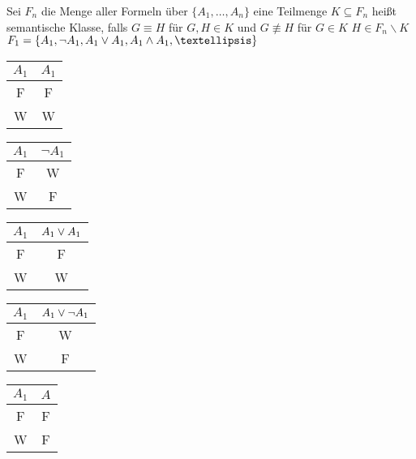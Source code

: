 

Sei $F_n$ die Menge aller Formeln über $\{A_1, …, A_n\}$ eine Teilmenge $K \subseteq F_n$ heißt semantische Klasse, falls $G \equiv H$ für $G, H \in K$ und $G \not\equiv H$ für $G\in K$ \hspace{.5cm} $H \in F_n \backslash K$\\

\beispiel{}
$F_1 = \{A_1, \neg A_1, A_1 \OR A_1, A_1 \AND A_1, … \}$\\

\begin{minipage}{0.15\textwidth}
\begin{tabular}{c|c}
$A_1$ & $A_1$\\
\hline
F & F\\
W & W\\
\end{tabular}
\end{minipage}
\hfill
\begin{minipage}{0.15\textwidth}
\begin{tabular}{c|c}
$A_1$ & $\neg A_1$ \\
\hline
F & W\\
W & F\\
\end{tabular}
\end{minipage}
\hfill
\begin{minipage}{0.15\textwidth}
\begin{tabular}{c|c}
$A_1$ & $A_1 \vee A_1$\\
\hline
F & F\\
W & W\\
\end{tabular}
\end{minipage}
\hfill
\begin{minipage}{0.15\textwidth}
\begin{tabular}{c|c}
$A_1$ & $A_1 \vee \neg A_1$\\
\hline
F & W\\
W & F\\
\end{tabular}
\end{minipage}
\hfill
\begin{minipage}{0.15\textwidth}
\begin{tabular}{c|c}
$A_1$ & $A$\\
\hline
F & F\\
W & F\\
\end{tabular}
\end{minipage}\\
